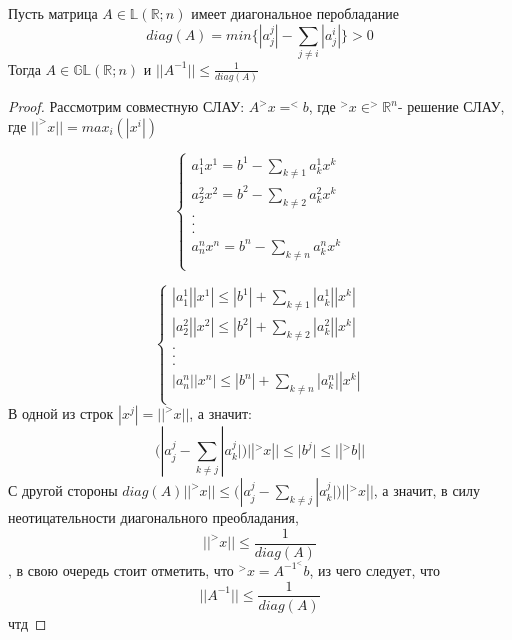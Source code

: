 \documentclass[__main__.tex]{subfiles}
\begin{document}
\begin{theorem}
Пусть матрица $A \in \mathbb{L}(\mathbb{R};n)$ имеет диагональное перобладание 
$$diag(A)=min\{|a^j_j|-\sum_{j\neq i} |a_j^i|\}>0$$
Тогда $A \in \mathbb{GL}(\mathbb{R};n)$ и $||A^{-1}||\le \frac{1}{diag(A)}$
\begin{proof}
Рассмотрим совместную СЛАУ:
$A^>x=^<b$, где $^>x\in ^>\mathbb{R}^n$- решение СЛАУ, где $||^>x||=max_i(|x^i|)$

\begin{equation}
\begin{cases}
a_1^1x^1=b^1-\sum_{k\neq 1} a_k^1 x^k\\
a_2^2x^2=b^2-\sum_{k\neq 2} a_k^2 x^k\\
.\\
.\\
.\\
a_n^n x^n=b^n-\sum_{k\neq n} a_k^n x^k\\
\end{cases}
\end{equation}

\begin{equation}
\begin{cases}
|a_1^1||x^1|\le |b^1|+\sum_{k\neq 1} |a_k^1| |x^k|\\
|a_2^2||x^2|\le |b^2|+\sum_{k\neq 2} |a_k^2| |x^k|\\
.\\
.\\
.\\
|a_n^n| |x^n|\le |b^n|+\sum_{k\neq n} |a_k^n| |x^k|\\
\end{cases}
\end{equation}
В одной из строк $|x^j|=||^>x||$, а значит:
$$(|a^j_j-\sum_{k\neq j} |a_k^j|)||^>x||\le|b^j|\le||^>b||$$
С другой стороны $diag(A) ||^>x||\le(|a^j_j-\sum_{k\neq j} |a_k^j|)||^>x||$, а значит, в силу неотицательности диагонального преобладания, $$||^>x||\le \frac{1}{diag(A)}$$, в свою очередь стоит отметить, что $^>x=A^{-1}^<b$, из чего следует, что $$||A^{-1}||\le\frac{1}{diag(A)} $$
чтд
\end{proof}
\end{theorem}
\end{document}
